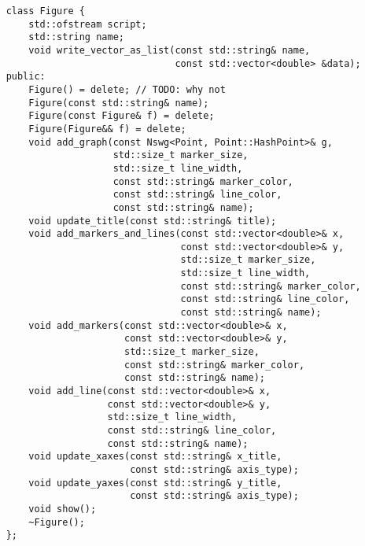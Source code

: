 \begin{verbatim}
    class Figure {
        std::ofstream script;
        std::string name;
        void write_vector_as_list(const std::string& name, 
                                  const std::vector<double> &data);
    public:
        Figure() = delete; // TODO: why not
        Figure(const std::string& name);
        Figure(const Figure& f) = delete;
        Figure(Figure&& f) = delete;
        void add_graph(const Nswg<Point, Point::HashPoint>& g,
                       std::size_t marker_size,
                       std::size_t line_width,
                       const std::string& marker_color,
                       const std::string& line_color,
                       const std::string& name);
        void update_title(const std::string& title);
        void add_markers_and_lines(const std::vector<double>& x,
                                   const std::vector<double>& y,
                                   std::size_t marker_size,
                                   std::size_t line_width,
                                   const std::string& marker_color,
                                   const std::string& line_color,
                                   const std::string& name);
        void add_markers(const std::vector<double>& x,
                         const std::vector<double>& y,
                         std::size_t marker_size,
                         const std::string& marker_color,
                         const std::string& name);
        void add_line(const std::vector<double>& x,
                      const std::vector<double>& y,
                      std::size_t line_width,
                      const std::string& line_color,
                      const std::string& name);
        void update_xaxes(const std::string& x_title, 
                          const std::string& axis_type);
        void update_yaxes(const std::string& y_title, 
                          const std::string& axis_type);
        void show();
        ~Figure();
    };
\end{verbatim}




